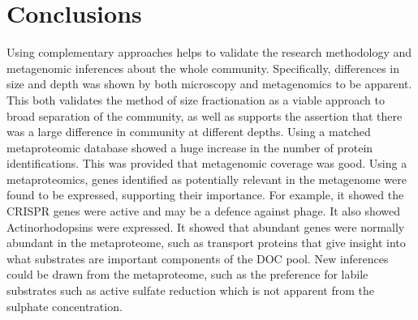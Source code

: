 \section{Conclusions}
Using complementary approaches helps to validate the research methodology and 
metagenomic inferences about the whole community.
Specifically, differences in size and depth was shown by both microscopy and metagenomics to be apparent.
This both validates the method of size fractionation as a viable approach to broad separation of the community,
as well as supports the assertion that there was a large difference in community at different depths.
Using a matched metaproteomic database showed a huge increase in the number of protein identifications.
This was provided that metagenomic coverage was good.
Using a metaproteomics, genes identified as potentially relevant in the metagenome were found to be expressed, supporting their importance.
For example, it showed the \ac{CRISPR} genes were active and may be a defence against phage.
It also showed Actinorhodopsins were expressed.
It showed that abundant genes were normally abundant in the metaproteome, such as transport proteins that give insight into what substrates are important components of the \ac{DOC} pool.
New inferences could be drawn from the metaproteome, such as the preference for labile substrates such as active sulfate reduction which is not apparent from the sulphate concentration.



